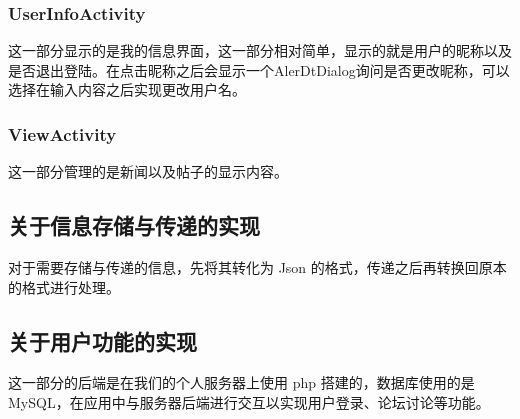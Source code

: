 \subsubsection{UserInfoActivity}

这一部分显示的是我的信息界面，这一部分相对简单，显示的就是用户的昵称以及是否退出登陆。在点击昵称之后会显示一个AlerDtDialog询问是否更改昵称，可以选择在输入内容之后实现更改用户名。

\subsubsection{ViewActivity}

这一部分管理的是新闻以及帖子的显示内容。

\subsection{关于信息存储与传递的实现}

对于需要存储与传递的信息，先将其转化为 Json 的格式，传递之后再转换回原本的格式进行处理。

\subsection{关于用户功能的实现}

这一部分的后端是在我们的个人服务器上使用 php 搭建的，数据库使用的是 MySQL，在应用中与服务器后端进行交互以实现用户登录、论坛讨论等功能。
